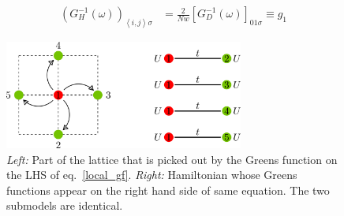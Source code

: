 \documentclass[12pt]{article}
\numberwithin{equation}{section}
\begin{document}
\begin{equation}\begin{aligned}
\label{nn_gf}
	\left(G_{H}^{-1}(\omega)\right)_{\left<i,j \right>\sigma} &= \frac{2}{Nw}\left[G_{D}^{-1}(\omega)\right]_{01\sigma} \equiv g_1
\end{aligned}\end{equation}
\begin{figure}[htpb!]
	\centering
	\hspace*{\fill}
	\includegraphics[width=0.7\textwidth]{./lattice.png}
	\hspace*{\fill}
	\caption{\textit{Left:} Part of the lattice that is picked out by the Greens function on the LHS of eq.~\ref{local_gf}. \textit{Right:} Hamiltonian whose Greens functions appear on the right hand side of same equation. The two submodels are identical.}
\end{figure}
\end{document}
